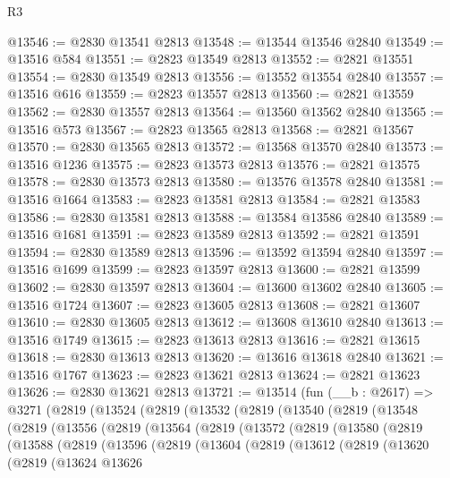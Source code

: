 \begin{lexlean}{R3}
\begin{coremodule}
@13546 := @2830 @13541 @2813
@13548 := @13544 @13546 @2840
@13549 := @13516 @584
@13551 := @2823 @13549 @2813
@13552 := @2821 @13551
@13554 := @2830 @13549 @2813
@13556 := @13552 @13554 @2840
@13557 := @13516 @616
@13559 := @2823 @13557 @2813
@13560 := @2821 @13559
@13562 := @2830 @13557 @2813
@13564 := @13560 @13562 @2840
@13565 := @13516 @573
@13567 := @2823 @13565 @2813
@13568 := @2821 @13567
@13570 := @2830 @13565 @2813
@13572 := @13568 @13570 @2840
@13573 := @13516 @1236
@13575 := @2823 @13573 @2813
@13576 := @2821 @13575
@13578 := @2830 @13573 @2813
@13580 := @13576 @13578 @2840
@13581 := @13516 @1664
@13583 := @2823 @13581 @2813
@13584 := @2821 @13583
@13586 := @2830 @13581 @2813
@13588 := @13584 @13586 @2840
@13589 := @13516 @1681
@13591 := @2823 @13589 @2813
@13592 := @2821 @13591
@13594 := @2830 @13589 @2813
@13596 := @13592 @13594 @2840
@13597 := @13516 @1699
@13599 := @2823 @13597 @2813
@13600 := @2821 @13599
@13602 := @2830 @13597 @2813
@13604 := @13600 @13602 @2840
@13605 := @13516 @1724
@13607 := @2823 @13605 @2813
@13608 := @2821 @13607
@13610 := @2830 @13605 @2813
@13612 := @13608 @13610 @2840
@13613 := @13516 @1749
@13615 := @2823 @13613 @2813
@13616 := @2821 @13615
@13618 := @2830 @13613 @2813
@13620 := @13616 @13618 @2840
@13621 := @13516 @1767
@13623 := @2823 @13621 @2813
@13624 := @2821 @13623
@13626 := @2830 @13621 @2813
@13721 := @13514
    (fun (__b : @2617) =>
    @3271
      (@2819
        (@13524
          (@2819
            (@13532
              (@2819
                (@13540
                  (@2819
                    (@13548
                      (@2819
                        (@13556
                          (@2819
                            (@13564
                              (@2819
                                (@13572
                                  (@2819
                                    (@13580
                                      (@2819
                                        (@13588
                                          (@2819
                                            (@13596
                                              (@2819
                                                (@13604
                                                  (@2819
                                                    (@13612
                                                      (@2819
                                                        (@13620
                                                          (@2819
                                                            (@13624
                                                              @13626

\end{coremodule}
\end{lexlean}
